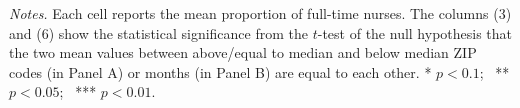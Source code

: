 \documentclass[final,12pt]{article}
\begin{document}
\begin{singlespace}
\begin{sidewaystable}[H]
\begin{threeparttable}
\begin{tabular}{l*{6}c}
\bottomrule
\end{tabular}
	\begin{tablenotes}
	\footnotesize
	\item \emph{Notes.} Each cell reports the mean proportion of full-time nurses. The columns (3) and (6) show the statistical significance from the $t$-test of the null hypothesis that the two mean values between above/equal to median and below median ZIP codes (in Panel A) or months (in Panel B) are equal to each other.
	* $p< 0.1$; \ ** $p< 0.05$; \ *** $p < 0.01$.
	\end{tablenotes}
\end{threeparttable}
\end{sidewaystable}





\end{singlespace}
\end{document}
